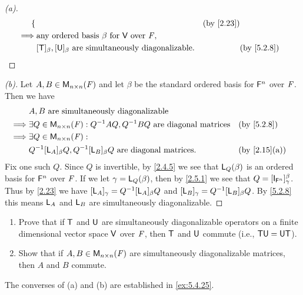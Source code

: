 \begin{proof}[(a)]
\begin{align*}
\begin{dcases}
		           \end{dcases} &  & \by{2.23}                    \\
		\implies & \text{any ordered basis } \beta \text{ for } \V \text{ over } \F,                                                                                                                                                                                 \\
		         & [\T]_{\beta}, [\U]_{\beta} \text{ are simultaneously diagonalizable}.                                                                                                                                                             &  & \by{5.2.8}
	\end{align*}
\end{proof}

\begin{proof}[(b)]
	Let \(A, B \in \mathsf{M}_{{n} \times n}({\mathit{F}})\) and let \(\beta\) be the standard ordered basis for \(\mathsf{F}^n\) over \(\mathit{F}\).
	Then we have
	\begin{align*}
		         & A, B \text{ are simultaneously diagonalizable}                                                       \\
		\implies & \exists Q \in \ms{n}{n}{\F} : Q^{-1} A Q, Q^{-1} B Q \text{ are diagonal matrices} &  & \by{5.2.8}   \\
		\implies & \exists Q \in \ms{n}{n}{\F} :                                                                        \\
		         & Q^{-1} [\L_A]_{\beta} Q, Q^{-1} [\L_B]_{\beta} Q \text{ are diagonal matrices}.    &  & \by{2.15}[a]
	\end{align*}
	Fix one such \(Q\).
	Since \(Q\) is invertible, by \cref{2.4.5} we see that \(\mathsf{L}_Q(\beta)\) is an ordered basis for \(\mathsf{F}^n\) over \(\mathit{F}\).
	If we let \(\gamma = \mathsf{L}_Q(\beta)\), then by \cref{2.5.1} we see that \(Q = [\IT[\vs{F}^n]]_{\gamma}^{\beta}\).
	Thus by \cref{2.23} we have \([\mathsf{L}_A]_{\gamma} = Q^{-1} [\mathsf{L}_A]_{\beta} Q\) and \([\mathsf{L}_B]_{\gamma} = Q^{-1} [\mathsf{L}_B]_{\beta} Q\).
	By \cref{5.2.8} this means \(\mathsf{L}_A\) and \(\mathsf{L}_B\) are simultaneously diagonalizable.
\end{proof}

\begin{ex}\label{ex:5.2.18}
	\begin{enumerate}
		\item Prove that if \(\mathsf{T}\) and \(\mathsf{U}\) are simultaneously diagonalizable operators on a finite dimensional vector space \(\mathsf{V}\) over \(\mathit{F}\), then \(\mathsf{T}\) and \(\mathsf{U}\) commute (i.e., \(\mathsf{T} \mathsf{U} = \mathsf{U} \mathsf{T}\)).
		\item Show that if \(A, B \in \mathsf{M}_{{n} \times n}({\mathit{F}})\) are simultaneously diagonalizable matrices, then \(A\) and \(B\) commute.
	\end{enumerate}
	The converses of (a) and (b) are established in \cref{ex:5.4.25}.
\end{ex}

